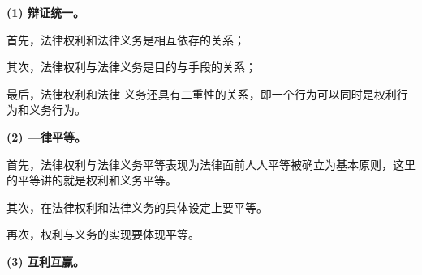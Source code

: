 \textbf{{(1) 辩证统一。}}

{首先，法律权利和法律义务是相互依存的关系；}

{其次，法律权利与法律义务是目的与手段的关系；}

{最后，法律权利和法律
义务还具有二重性的关系，即一个行为可以同时是权利行为和义务行为。}

\textbf{{(2) ---律平等。}}

{首先，法律权利与法律义务平等表现为法律面前人人平等被确立为基本原则，这里的平等讲的就是权利和义务平等。}{}

{其次，在法律权利和法律义务的具体设定上要平等。}

{再次，权利与义务的实现要体现平等。}

\textbf{{(3) 互利互赢。}{}}
